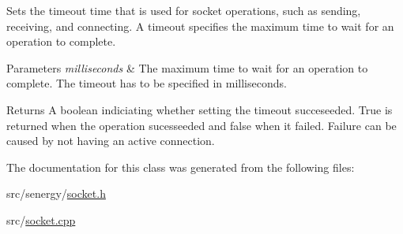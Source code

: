 Sets the timeout time that is used for socket operations, such as sending, receiving, and connecting. A timeout specifies the maximum time to wait for an operation to complete. 


\begin{DoxyParams}{Parameters}
{\em milliseconds} & The maximum time to wait for an operation to complete. The timeout has to be specified in milliseconds.\\
\hline
\end{DoxyParams}
\begin{DoxyReturn}{Returns}
A boolean indiciating whether setting the timeout succeseeded. True is returned when the operation sucesseeded and false when it failed. Failure can be caused by not having an active connection. 
\end{DoxyReturn}


The documentation for this class was generated from the following files\-:\begin{DoxyCompactItemize}
\item 
src/senergy/\hyperlink{socket_8h}{socket.\-h}\item 
src/\hyperlink{socket_8cpp}{socket.\-cpp}\end{DoxyCompactItemize}
